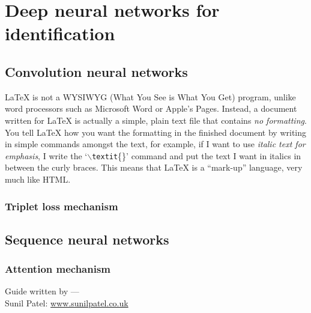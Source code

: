 
\chapter{Deep neural networks for identification} %

\label{Chapter3} %




\section{Convolution neural networks}

\LaTeX{} is not a WYSIWYG (What You See is What You Get) program, unlike word processors such as Microsoft Word or Apple's Pages. Instead, a document written for \LaTeX{} is actually a simple, plain text file that contains \emph{no formatting}. You tell \LaTeX{} how you want the formatting in the finished document by writing in simple commands amongst the text, for example, if I want to use \textit{italic text for emphasis}, I write the `$\backslash$\texttt{textit}\{\}' command and put the text I want in italics in between the curly braces. This means that \LaTeX{} is a ``mark-up'' language, very much like HTML.

\subsection{Triplet loss mechanism}

\section{Sequence neural networks}

\subsection{Attention mechanism}

\begin{flushright}
Guide written by ---\\
Sunil Patel: \href{http://www.sunilpatel.co.uk}{www.sunilpatel.co.uk}
\end{flushright}
